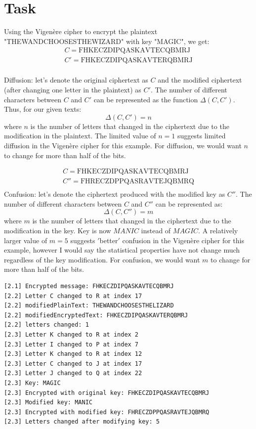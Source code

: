 \documentclass{article}
\begin{document}
\section{Task}%
Using the Vigenère cipher to encrypt the plaintext "THEWANDCHOOSESTHEWIZARD" with key "MAGIC", we get:
\begin{gather*}
    C = \text{{FHKECZDIPQASKAVTECQBMRJ}}\\
    C' = \text{{FHKECZDIPQASKAVTERQBMRJ}}\\
\end{gather*}

Diffusion: let's denote the original ciphertext as \( C \) and the modified ciphertext (after changing one letter in the plaintext) as \(
C' \).
The number of different characters between \( C \) and \( C' \) can be represented as the function \( \Delta(C, C') \).
Thus, for our given texts:
\[ \Delta(C, C') = n \]
where \( n \) is the number of letters that changed in the ciphertext due to the modification in the plaintext.
The limited value of \( n=1 \) suggests limited diffusion in the Vigenère cipher for this example.
For diffusion, we would want \( n \) to change for more than half of the bits.

\begin{gather*}
    C = \text{{FHKECZDIPQASKAVTECQBMRJ}}\\
    C'' = \text{{FHRECZDPPQASRAVTEJQBMRQ}}\\
\end{gather*}
Confusion: let's denote the ciphertext produced with the modified key as \( C'' \).
The number of different characters between \( C \) and \( C'' \) can be represented as:
\[ \Delta(C, C'') = m \]
where \( m \) is the number of letters that changed in the ciphertext due to the modification in the key.
Key is now \( MANIC \) instead of \( MAGIC \).
A relatively larger value of \( m=5 \) suggests \('\)better\('\) confusion in the Vigenère cipher for this example, however
I would say the statistical properties have not change much regardless of the key modification.
For confusion, we would want \( m \) to change for more than half of the bits.\\

\begin{verbatim}
[2.1] Encrypted message: FHKECZDIPQASKAVTECQBMRJ
[2.2] Letter C changed to R at index 17
[2.2] modifiedPlainText: THEWANDCHOOSESTHELIZARD
[2.2] modifiedEncryptedText: FHKECZDIPQASKAVTERQBMRJ
[2.2] letters changed: 1
[2.3] Letter K changed to R at index 2
[2.3] Letter I changed to P at index 7
[2.3] Letter K changed to R at index 12
[2.3] Letter C changed to J at index 17
[2.3] Letter J changed to Q at index 22
[2.3] Key: MAGIC
[2.3] Encrypted with original key: FHKECZDIPQASKAVTECQBMRJ
[2.3] Modified key: MANIC
[2.3] Encrypted with modified key: FHRECZDPPQASRAVTEJQBMRQ
[2.3] Letters changed after modifying key: 5
\end{verbatim}
\end{document}
